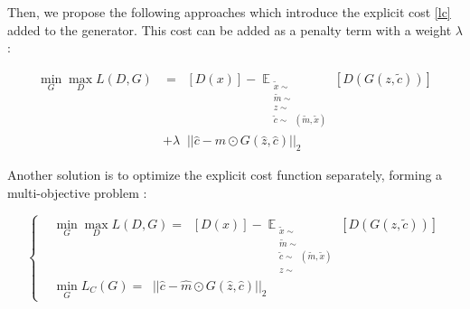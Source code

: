 \documentclass{article}
\begin{document}
	Then, we propose the following approaches which introduce the explicit cost \eqref{lc} added to the generator. This cost can be added as a penalty term with a weight $\lambda$ :
	
	\begin{align}
	\min_G\max_D L(D, G)  &= \mathop{\mathbb{{E}}_{\substack{
				x \sim \mathop{\mathbb{{P}}_{r}} 
	}}} [D(x)] 
	- \mathop{\mathbb{{E}}}_{\substack{
			\tilde{x} \sim \mathop{\mathbb{{P}}_{r}} \\
			\tilde{m} \sim \mathop{\mathbb{{P}}_{m} }\\
			z \sim \mathop{\mathbb{{P}}_{z} }\\
			\tilde{c} \sim \mathop{\mathbb{{P}}_{c}}(\tilde{m}, \tilde{x})
	}} [D(G(z, \tilde{c}))]   \nonumber \\
	& + \lambda \mathop{\mathbb{{E}}_{\substack{
				\hat{x} \sim \mathop{\mathbb{{P}}_{r}} \\
				\hat{z} \sim \mathop{\mathbb{{P}}_{z}}\\
				\hat{m} \sim \mathop{\mathbb{{P}}_{z}} \\	
				\hat{c} \sim \mathop{\mathbb{{P}}_{c}}(\hat{m}, \hat{x})
	}}} || \hat{c} - \hat{m} \odot G(\hat{z}, \hat{c}) ||_2
	\end{align}
	
	Another solution is to optimize the explicit cost function separately, forming a multi-objective problem : 
	
	\begin{equation}
	\left\{  \begin{split}
	& \min_G \max_D L(D, G)  = \mathop{\mathbb{{E}}_{\substack{
				x \sim \mathop{\mathbb{{P}}_{r}} \\
				m \sim \mathop{\mathbb{{P}}_{m}}\\
				c \sim \mathop{\mathbb{{P}}_{c}}(m, x)
	}}} [D(x)] 
	- \mathop{\mathbb{{E}}}_{\substack{
			\tilde{x} \sim \mathop{\mathbb{{P}}_{r}} \\
			\tilde{m} \sim \mathop{\mathbb{{P}}_{m} }\\
			\tilde{c} \sim \mathop{\mathbb{{P}}_{c}}(\tilde{m}, \tilde{x})\\
			z \sim \mathop{\mathbb{{P}}_{z} }
	}} [D(G(z, \tilde{c}))] \\
	& \min_G L_C(G) = \mathop{\mathbb{{E}}_{\substack{
				\hat{x} \sim \mathop{\mathbb{{P}}_{r}} \\
				\hat{z} \sim \mathop{\mathbb{{P}}_{z}}\\
				\hat{m} \sim \mathop{\mathbb{{P}}_{z}} \\	
				\hat{c} \sim \mathop{\mathbb{{P}}_{c}}(\hat{m}, \hat{x})
	}}} || \hat{c} - \hat{m} \odot G(\hat{z}, \hat{c}) ||_2
	\end{split}\right.
	\end{equation}
	
\end{document}
